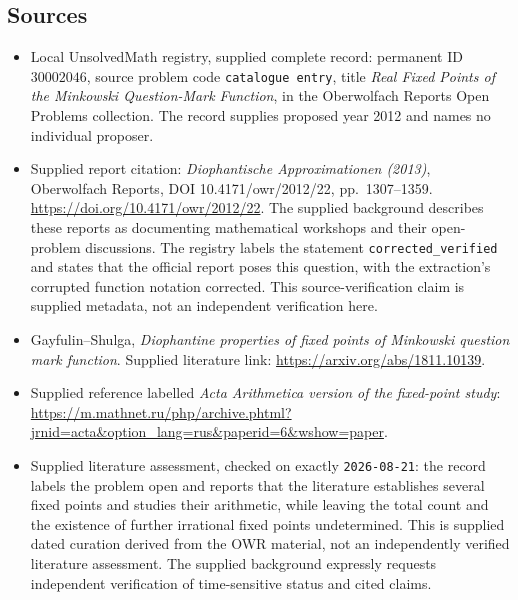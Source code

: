 \documentclass[11pt]{article}
\begin{document}
\subsection{Sources}
\begin{itemize}
\item Local UnsolvedMath registry, supplied complete record: permanent ID \(30002046\), source problem code \texttt{catalogue entry}, title \emph{Real Fixed Points of the Minkowski Question-Mark Function}, in the Oberwolfach Reports Open Problems collection. The record supplies proposed year 2012 and names no individual proposer.
\item Supplied report citation: \emph{Diophantische Approximationen (2013)}, Oberwolfach Reports, DOI 10.4171/owr/2012/22, pp.\ 1307--1359. \url{https://doi.org/10.4171/owr/2012/22}. The supplied background describes these reports as documenting mathematical workshops and their open-problem discussions. The registry labels the statement \texttt{corrected\_verified} and states that the official report poses this question, with the extraction's corrupted function notation corrected. This source-verification claim is supplied metadata, not an independent verification here.
\item Gayfulin--Shulga, \emph{Diophantine properties of fixed points of Minkowski question mark function}. Supplied literature link: \url{https://arxiv.org/abs/1811.10139}.
\item Supplied reference labelled \emph{Acta Arithmetica version of the fixed-point study}: \url{https://m.mathnet.ru/php/archive.phtml?jrnid=acta&option_lang=rus&paperid=6&wshow=paper}.
\item Supplied literature assessment, checked on exactly \texttt{2026-08-21}: the record labels the problem open and reports that the literature establishes several fixed points and studies their arithmetic, while leaving the total count and the existence of further irrational fixed points undetermined. This is supplied dated curation derived from the OWR material, not an independently verified literature assessment. The supplied background expressly requests independent verification of time-sensitive status and cited claims.
\end{itemize}
\end{document}
